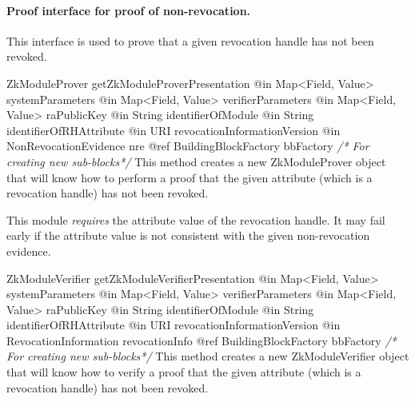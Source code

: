     \paragraph{Proof interface for proof of non-revocation.}
    This interface is used to prove that a given revocation handle has not been revoked.

      \begin{method}
      {ZkModuleProver}
      {getZkModuleProverPresentation}
      {
        {@in Map<Field, Value> systemParameters}
        {@in Map<Field, Value> verifierParameters}
        {@in Map<Field, Value> raPublicKey}
        {@in String identifierOfModule}
        {@in String identifierOfRHAttribute}
        {@in URI revocationInformationVersion}
        {@in NonRevocationEvidence nre}
        {@ref BuildingBlockFactory bbFactory \textrm{\emph{/* For creating new sub-blocks*/}}}
      }
      This method creates a new ZkModuleProver object that will know how to perform
      a proof that the given attribute (which is a revocation handle) has not
      been revoked.

      This module \emph{requires} the attribute value of the revocation handle. It may
      fail early if the attribute value is not consistent with the given non-revocation evidence.
      \end{method}
      \begin{method}
      {ZkModuleVerifier}
      {getZkModuleVerifierPresentation}
      {
        {@in Map<Field, Value> systemParameters}
        {@in Map<Field, Value> verifierParameters}
        {@in Map<Field, Value> raPublicKey}
        {@in String identifierOfModule}
        {@in String identifierOfRHAttribute}
        {@in URI revocationInformationVersion}
        {@in RevocationInformation revocationInfo}
        {@ref BuildingBlockFactory bbFactory \textrm{\emph{/* For creating new sub-blocks*/}}}
      }
      This method creates a new ZkModuleVerifier object that will know how to verify
      a proof that the given attribute (which is a revocation handle) has not
      been revoked.
      \end{method}


